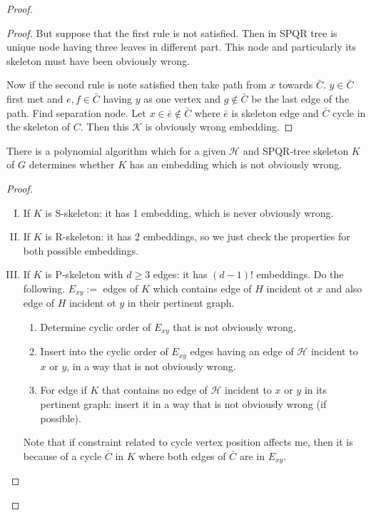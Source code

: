 \begin{proof}
\begin{proof}
		But suppose that the first rule is not satisfied. Then in SPQR tree is unique node having three leaves in different part. This node and particularly its skeleton must have been obviously wrong.
		
		Now if the second rule is note satisfied then take path from $x$ towards $\bar{C}$. $y \in \bar{C}$ first met and $e,f \in \bar{C}$ having $y$ as one vertex and $g \notin \bar{C}$ be the last edge of the path. Find separation node. Let $x\in \bar{e} \notin \bar{C}$ where $\bar{e}$ is skeleton edge and $\bar{C}$ cycle in the skeleton of $C$. Then this $\mathcal{K}$ is obviously wrong embedding.
	\end{proof}

	\begin{thm}
		There is a polynomial algorithm which for a given $\mathcal{H}$ and SPQR-tree skeleton $K$ of $G$ determines whether $K$ has an embedding which is not obviously wrong.
	\end{thm}

	\begin{proof}
		\begin{enumerate}[I)]
			\item If $K$ is S-skeleton: it has 1 embedding, which is never obviously wrong.
			\item If $K$ is R-skeleton: it has 2 embeddings, so we just check the properties for both possible embeddings.
			\item If $K$ is P-skeleton with $d \geq 3$ edges: it has $(d-1)!$ embeddings. Do the following. $E_{xy} :=$ edges of $K$ which contains edge of $H$ incident ot $x$ and also edge of $H$ incident ot $y$ in their pertinent graph.
			
			\begin{enumerate}[1.]
				\item Determine cyclic order of $E_{xy}$ that is not obviously wrong.
				\item Insert into the cyclic order of $E_{xy}$ edges having an edge of $\mathcal{H}$ incident to $x$ or $y$, in a way that is not obviously wrong.
				\item For edge if $K$ that contains no edge of $\mathcal{H}$ incident to $x$ or $y$ in its pertinent graph: insert it in a way that is not obviously wrong (if possible).
			\end{enumerate}
		
			\noindent Note that if constraint related to cycle vertex position affects me, then it is because of a cycle $\bar{C}$ in $K$ where both edges of $\bar{C}$ are in $E_{xy}$.
		\end{enumerate}
	\end{proof}
\end{proof}